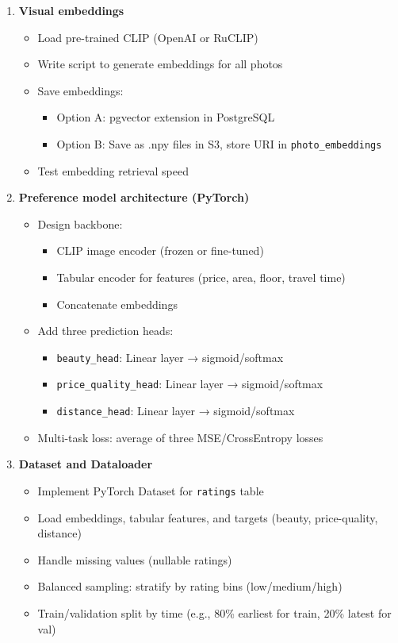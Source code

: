 \documentclass[12pt,a4paper]{article}
\begin{document}
\begin{enumerate}
    \item \textbf{Visual embeddings}
    \begin{itemize}
        \item Load pre-trained CLIP (OpenAI or RuCLIP)
        \item Write script to generate embeddings for all photos
        \item Save embeddings:
        \begin{itemize}
            \item Option A: pgvector extension in PostgreSQL
            \item Option B: Save as .npy files in S3, store URI in \texttt{photo\_embeddings}
        \end{itemize}
        \item Test embedding retrieval speed
    \end{itemize}
    
    \item \textbf{Preference model architecture (PyTorch)}
    \begin{itemize}
        \item Design backbone:
        \begin{itemize}
            \item CLIP image encoder (frozen or fine-tuned)
            \item Tabular encoder for features (price, area, floor, travel time)
            \item Concatenate embeddings
        \end{itemize}
        \item Add three prediction heads:
        \begin{itemize}
            \item \texttt{beauty\_head}: Linear layer → sigmoid/softmax
            \item \texttt{price\_quality\_head}: Linear layer → sigmoid/softmax
            \item \texttt{distance\_head}: Linear layer → sigmoid/softmax
        \end{itemize}
        \item Multi-task loss: average of three MSE/CrossEntropy losses
    \end{itemize}
    
    \item \textbf{Dataset and Dataloader}
    \begin{itemize}
        \item Implement PyTorch Dataset for \texttt{ratings} table
        \item Load embeddings, tabular features, and targets (beauty, price-quality, distance)
        \item Handle missing values (nullable ratings)
        \item Balanced sampling: stratify by rating bins (low/medium/high)
        \item Train/validation split by time (e.g., 80\% earliest for train, 20\% latest for val)
    \end{itemize}
    

\end{enumerate}
\end{document}
